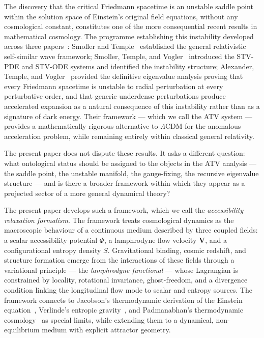 \documentclass[12pt,a4paper]{article}
\theoremstyle{plain}
\theoremstyle{definition}
\theoremstyle{remark}
\begin{document}
The discovery that the critical Friedmann spacetime is an unstable saddle point
within the solution space of Einstein's original field equations, without any
cosmological constant, constitutes one of the more consequential recent results
in mathematical cosmology. The programme establishing this instability developed
across three papers~\cite{Smoller2012,STV2017,ATV2026}: Smoller and Temple~\cite{Smoller2012}
established the general relativistic self-similar wave framework; Smoller, Temple,
and Vogler~\cite{STV2017} introduced the STV-PDE and STV-ODE systems and identified
the instability structure; Alexander, Temple, and Vogler~\cite{ATV2026} provided
the definitive eigenvalue analysis proving that every Friedmann spacetime is unstable
to radial perturbation at every perturbative order, and that generic underdense
perturbations produce accelerated expansion as a natural consequence of this
instability rather than as a signature of dark energy. Their framework --- which we
call the ATV system --- provides a mathematically rigorous alternative to $\Lambda$CDM
for the anomalous acceleration problem, while remaining entirely within classical
general relativity.

The present paper does not dispute these results. It asks a different question:
what ontological status should be assigned to the objects in the ATV analysis ---
the saddle point, the unstable manifold, the gauge-fixing, the recursive eigenvalue
structure --- and is there a broader framework within which they appear as a
projected sector of a more general dynamical theory?

The present paper develops such a framework, which we call the
\emph{accessibility relaxation formalism}. The framework treats cosmological dynamics
as the macroscopic behaviour of a continuous medium described by three coupled fields:
a scalar accessibility potential $\Phi$, a lamphrodyne flow velocity $\mathbf{V}$,
and a configurational entropy density $S$. Gravitational binding, cosmic redshift,
and structure formation emerge from the interactions of these fields through a
variational principle --- the \emph{lamphrodyne functional} --- whose Lagrangian
is constrained by locality, rotational invariance, ghost-freedom, and a divergence
condition linking the longitudinal flow mode to scalar and entropy sources.
The framework connects to Jacobson's thermodynamic derivation of the Einstein
equation~\cite{Jacobson1995}, Verlinde's entropic gravity~\cite{Verlinde2011},
and Padmanabhan's thermodynamic cosmology~\cite{Padmanabhan2010} as special
limits, while extending them to a dynamical, non-equilibrium medium with explicit
attractor geometry.
\end{document}

